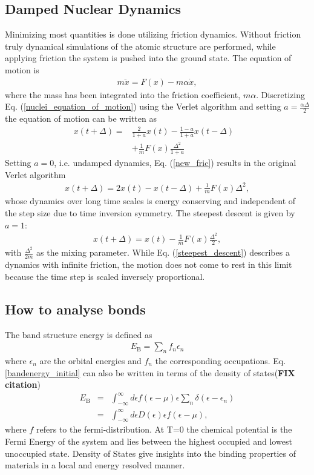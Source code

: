 \documentclass[%
 reprint,
nofootinbib,
 amsmath,amssymb,
 aps,
]{revtex4-2}
\begin{document}
\subsection{Damped Nuclear Dynamics}
Minimizing most quantities is done utilizing friction dynamics. Without friction truly dynamical simulations of the atomic structure are performed, while applying friction the system is pushed into the ground state. 
The equation of motion is 
\begin{eqnarray}
m\ddot{x} = F(x) - m\alpha \dot{x}, \label{nuclei_equation_of_motion}
\end{eqnarray}
where the mass has been integrated into the friction coefficient, $m\alpha$. Discretizing Eq. (\ref{nuclei_equation_of_motion}) using the Verlet\cite{Verlet} algorithm and setting $a=\frac{\alpha\Delta}{2}$ the equation of motion can be written as 
\begin{eqnarray}
x(t+\Delta)=&\frac{2}{1+a}x(t)-\frac{1-a}{1+a}x(t-\Delta)&\nonumber\\ &+\frac{1}{m}F(x)\frac{\Delta^2}{1+a}&\label{new_fric}
\end{eqnarray}
Setting $a=0$, i.e. undamped dynamics, Eq. (\ref{new_fric}) results in the original Verlet algorithm
\begin{eqnarray}
x(t+\Delta)=2x(t)-x(t-\Delta)+\frac{1}{m}F(x)\Delta^2, \label{original_verlet}
\end{eqnarray}
whose dynamics over long time scales is energy conserving and independent of the step size due to time inversion symmetry. 
The steepest descent is given by $a=1$:
\begin{eqnarray}
x(t+\Delta)=x(t)-\frac{1}{m}F(x)\frac{\Delta^2}{2}, \label{steepest_descent}
\end{eqnarray}
with $\frac{\Delta^2}{2m}$ as the mixing parameter. While Eq. (\ref{steepest_descent}) describes a dynamics with infinite friction, the motion does not come to rest in this limit because the time step is scaled inversely proportional. \cite{CPPAWMANUAL}

\subsection{\label{COOPsection} How to analyse bonds}
The band structure energy is defined as 
\begin{eqnarray}
E_\text{B} =\sum_n f_n\epsilon_n \label{bandenergy_initial}
\end{eqnarray}
where $\epsilon_n$ are the orbital energies and $f_n$ the corresponding occupations. Eq. \ref{bandenergy_initial} can also be written in terms of the density of states\cite{HANDSON}(\textbf{FIX citation})
\begin{eqnarray}
E_\text{B}&=&\int_{-\infty}^{\infty}d\epsilon f(\epsilon-\mu)\epsilon\sum_n\delta(\epsilon-\epsilon_n)\\
&=&\int_{-\infty}^{\infty}d\epsilon D(\epsilon)\epsilon f(\epsilon-\mu), \label{bandenergy}
\end{eqnarray}
where $f$ refers to the fermi-distribution. At T=0 the chemical potential is the Fermi Energy of the system and lies between the highest occupied and lowest unoccupied state. 
Density of States give insights into the binding properties of materials in a local and energy resolved manner.
\end{document}
